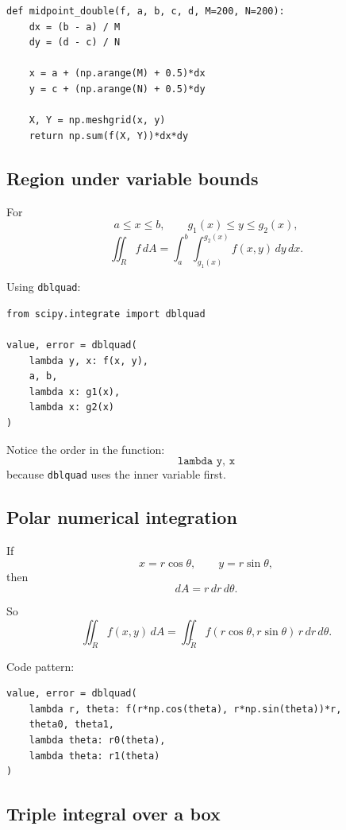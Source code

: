 \begin{verbatim}
def midpoint_double(f, a, b, c, d, M=200, N=200):
    dx = (b - a) / M
    dy = (d - c) / N

    x = a + (np.arange(M) + 0.5)*dx
    y = c + (np.arange(N) + 0.5)*dy

    X, Y = np.meshgrid(x, y)
    return np.sum(f(X, Y))*dx*dy
\end{verbatim}

\subsection*{Region under variable bounds}

For
\[
    a\le x\le b,
    \qquad
    g_1(x)\le y\le g_2(x),
\]
\[
\boxed{
    \iint_R f\,dA
    =
    \int_a^b\int_{g_1(x)}^{g_2(x)}f(x,y)\,dy\,dx.
}
\]

Using \texttt{dblquad}:

\begin{verbatim}
from scipy.integrate import dblquad

value, error = dblquad(
    lambda y, x: f(x, y),
    a, b,
    lambda x: g1(x),
    lambda x: g2(x)
)
\end{verbatim}

Notice the order in the function:
\[
\boxed{
    \texttt{lambda y, x}
}
\]
because \texttt{dblquad} uses the inner variable first.

\subsection*{Polar numerical integration}

If
\[
    x=r\cos\theta,
    \qquad
    y=r\sin\theta,
\]
then
\[
\boxed{
    dA=r\,dr\,d\theta.
}
\]

So
\[
\boxed{
    \iint_R f(x,y)\,dA
    =
    \iint_{\widetilde R}
    f(r\cos\theta,r\sin\theta)\,r\,dr\,d\theta.
}
\]

Code pattern:

\begin{verbatim}
value, error = dblquad(
    lambda r, theta: f(r*np.cos(theta), r*np.sin(theta))*r,
    theta0, theta1,
    lambda theta: r0(theta),
    lambda theta: r1(theta)
)
\end{verbatim}

\subsection*{Triple integral over a box}

